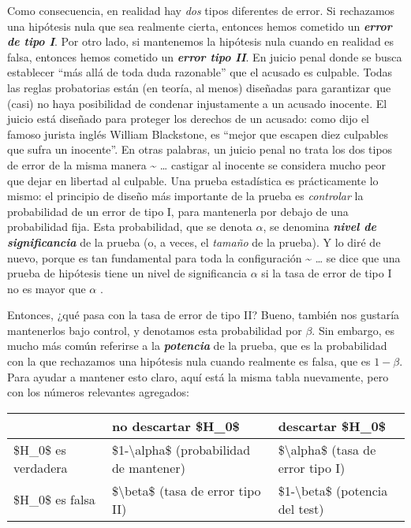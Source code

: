 \documentclass[
]{book}
\begin{document}
Como consecuencia, en realidad hay \emph{dos} tipos diferentes de error. Si rechazamos una hipótesis nula que sea realmente cierta, entonces hemos cometido un \textbf{\emph{error de tipo I}}. Por otro lado, si mantenemos la hipótesis nula cuando en realidad es falsa, entonces hemos cometido un \textbf{\emph{error tipo II}}. En juicio penal donde se busca establecer ``más allá de toda duda razonable'' que el acusado es culpable. Todas las reglas probatorias están (en teoría, al menos) diseñadas para garantizar que (casi) no haya posibilidad de condenar injustamente a un acusado inocente. El juicio está diseñado para proteger los derechos de un acusado: como dijo el famoso jurista inglés William Blackstone, es ``mejor que escapen diez culpables que sufra un inocente''. En otras palabras, un juicio penal no trata los dos tipos de error de la misma manera \textasciitilde{} \ldots{} castigar al inocente se considera mucho peor que dejar en libertad al culpable. Una prueba estadística es prácticamente lo mismo: el principio de diseño más importante de la prueba es \emph{controlar} la probabilidad de un error de tipo I, para mantenerla por debajo de una probabilidad fija. Esta probabilidad, que se denota \(\alpha\), se denomina \textbf{\emph{nivel de significancia}} de la prueba (o, a veces, el \emph{tamaño} de la prueba). Y lo diré de nuevo, porque es tan fundamental para toda la configuración \textasciitilde{} \ldots{} se dice que una prueba de hipótesis tiene un nivel de significancia \(\alpha\) si la tasa de error de tipo I no es mayor que \(\alpha\) .

Entonces, ¿qué pasa con la tasa de error de tipo II? Bueno, también nos gustaría mantenerlos bajo control, y denotamos esta probabilidad por \(\beta\). Sin embargo, es mucho más común referirse a la \textbf{\emph{potencia}} de la prueba, que es la probabilidad con la que rechazamos una hipótesis nula cuando realmente es falsa, que es \(1-\beta\). Para ayudar a mantener esto claro, aquí está la misma tabla nuevamente, pero con los números relevantes agregados:

\begin{tabular}{l|l|l}
\hline
 & no descartar \$H\_0\$ & descartar \$H\_0\$\\
\hline
\$H\_0\$ es verdadera & \$1-\textbackslash{}alpha\$ (probabilidad de mantener) & \$\textbackslash{}alpha\$ (tasa de error tipo I)\\
\hline
\$H\_0\$ es falsa & \$\textbackslash{}beta\$ (tasa de error tipo II) & \$1-\textbackslash{}beta\$  (potencia del test)\\
\hline
\end{tabular}
\end{document}
